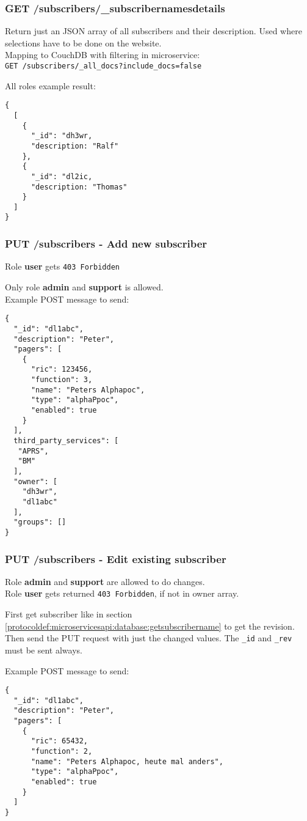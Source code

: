 \subsubsection{GET /subscribers/\_subscribernamesdetails}
Return just an JSON array of all subscribers and their description. Used where selections have to be done on the website.\\
Mapping to CouchDB with filtering in microservice:\\
\verb|GET /subscribers/_all_docs?include_docs=false|

All roles example result:
\begin{lstlisting}
{
  [
    {
      "_id": "dh3wr,
      "description: "Ralf"
    },
    {
      "_id": "dl2ic,
      "description: "Thomas"
    }
  ]
}
\end{lstlisting}


\subsubsection{PUT /subscribers - Add new subscriber}

Role \textbf{user} gets \verb|403 Forbidden|

Only role \textbf{admin} and \textbf{support} is allowed.\\
Example POST message to send:
\begin{lstlisting}
{
  "_id": "dl1abc",
  "description": "Peter",
  "pagers": [
    {
      "ric": 123456,
      "function": 3,
      "name": "Peters Alphapoc",
      "type": "alphaPpoc",
      "enabled": true
    }
  ],
  third_party_services": [
   "APRS",
   "BM"
  ],
  "owner": [
    "dh3wr",
    "dl1abc"
  ],
  "groups": []
}
\end{lstlisting}

\subsubsection{PUT /subscribers - Edit existing subscriber}
Role \textbf{admin} and \textbf{support} are allowed to do changes.\\
Role \textbf{user} gets returned \verb|403 Forbidden|, if not in owner array.

First get subscriber like in section \ref{protocoldef:microservicesapi:database:getsubscribername} to get the revision. Then send the PUT request with just the changed values. The \verb|_id| and \verb|_rev| must be sent always.

Example POST message to send:
\begin{lstlisting}
{
  "_id": "dl1abc",
  "description": "Peter",
  "pagers": [
    {
      "ric": 65432,
      "function": 2,
      "name": "Peters Alphapoc, heute mal anders",
      "type": "alphaPpoc",
      "enabled": true
    }
  ]
}
\end{lstlisting}


